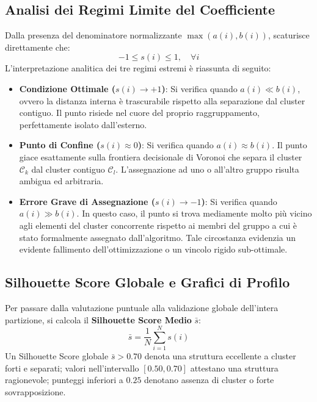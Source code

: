 \subsection{Analisi dei Regimi Limite del Coefficiente}
Dalla presenza del denominatore normalizzante $\max(a(i), b(i))$, scaturisce direttamente che:
\begin{equation}
-1 \le s(i) \le 1, \quad \forall i
\end{equation}
L'interpretazione analitica dei tre regimi estremi è riassunta di seguito:
\begin{itemize}
    \item \textbf{Condizione Ottimale ($s(i) \to +1$)}: Si verifica quando $a(i) \ll b(i)$, ovvero la distanza interna è trascurabile rispetto alla separazione dal cluster contiguo. Il punto risiede nel cuore del proprio raggruppamento, perfettamente isolato dall'esterno.
    \item \textbf{Punto di Confine ($s(i) \approx 0$)}: Si verifica quando $a(i) \approx b(i)$. Il punto giace esattamente sulla frontiera decisionale di Voronoi che separa il cluster $\mathcal{C}_k$ dal cluster contiguo $\mathcal{C}_l$. L'assegnazione ad uno o all'altro gruppo risulta ambigua ed arbitraria.
    \item \textbf{Errore Grave di Assegnazione ($s(i) \to -1$)}: Si verifica quando $a(i) \gg b(i)$. In questo caso, il punto si trova mediamente molto più vicino agli elementi del cluster concorrente rispetto ai membri del gruppo a cui è stato formalmente assegnato dall'algoritmo. Tale circostanza evidenzia un evidente fallimento dell'ottimizzazione o un vincolo rigido sub-ottimale.
\end{itemize}

\FloatBarrier
\subsection{Silhouette Score Globale e Grafici di Profilo}
Per passare dalla valutazione puntuale alla validazione globale dell'intera partizione, si calcola il \textbf{Silhouette Score Medio} $\bar{s}$:
\begin{equation}
\label{eq:dm-mean-silhouette-score}
\bar{s} = \frac{1}{N} \sum_{i=1}^N s(i)
\end{equation}
Un Silhouette Score globale $\bar{s} > 0.70$ denota una struttura eccellente a cluster forti e separati; valori nell'intervallo $[0.50, 0.70]$ attestano una struttura ragionevole; punteggi inferiori a $0.25$ denotano assenza di cluster o forte sovrapposizione.

